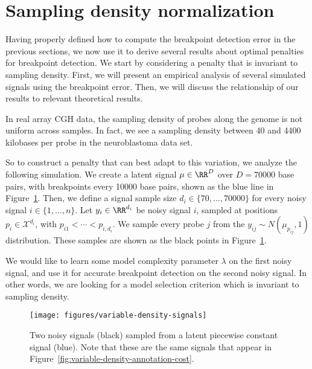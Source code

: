 \documentclass{article}
\begin{document}
\newpage

\section{Sampling density normalization}
\label{variable_density}
Having properly defined how to compute the breakpoint detection error
in the previous sections, we now use it to derive several results
about optimal penalties for breakpoint detection. We start by
considering a penalty that is invariant to sampling density. First, we
will present an empirical analysis of several simulated signals using
the breakpoint error. Then, we will discuss the relationship of our
results to relevant theoretical results.

In real array CGH data, the sampling density of probes along the
genome is not uniform across samples. In fact, we see a sampling
density between 40 and 4400 kilobases per probe in the neuroblastoma
data set.

So to construct a penalty that can best adapt to this variation, we
analyze the following simulation. We create a latent signal
$\mu\in\RR^D$ over $D=70000$ base pairs, with breakpoints every 10000
base pairs, shown as the blue line in
Figure~\ref{fig:variable-density-signals}. Then, we define a signal
sample size $d_i\in\{70,\dots,70000\}$ for every noisy signal
$i\in\{1,\dots,n\}$. Let $y_i\in\RR^{d_i}$ be noisy signal $i$,
sampled at positions $p_i\in\mathcal X^{d_i}$, with
$p_{i1}<\cdots<p_{i,d_i}$. We sample every probe $j$ from the
$y_{ij}\sim N(\mu_{p_{ij}},1)$ distribution. These samples are shown
as the black points in Figure~\ref{fig:variable-density-signals}.

We would like to learn some model complexity parameter $\lambda$ on
the first noisy signal, and use it for accurate breakpoint detection
on the second noisy signal. In other words, we are looking for a model
selection criterion which is invariant to sampling density. 

\begin{figure}[H]
\texttt{[image: figures/variable-density-signals]}
%
\vskip -0.3cm
  \caption{Two noisy signals (black) sampled from
  a latent piecewise constant signal (blue). Note that these are the
  same signals that appear in
  Figure~\ref{fig:variable-density-annotation-cost}.}
\label{fig:variable-density-signals}
\end{figure}

\newpage
\end{document}
